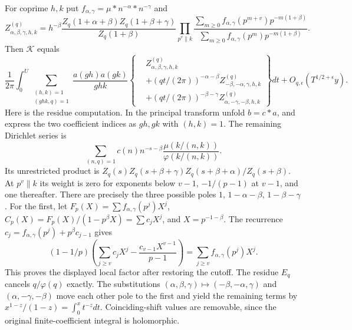 For coprime $h,k$ put $f_{\alpha,\gamma}=\mu*n^{-\alpha}*n^{-\gamma}$
and
\[
 Z^{(q)}_{\alpha,\beta,\gamma,h,k}
 =h^{-\beta}\frac{Z_q(1+\alpha+\beta)Z_q(1+\beta+\gamma)}{Z_q(1+\beta)}
 \prod_{p^v\parallel k}
 \frac{\sum_{m\ge0}f_{\alpha,\gamma}(p^{m+v})p^{-m(1+\beta)}}
      {\sum_{m\ge0}f_{\alpha,\gamma}(p^m)p^{-m(1+\beta)}}.
\]
Then $\mathcal K$ equals
\begin{equation}\label{eq:dirichlet-three-residue}
 \frac1{2\pi}\int_0^U\sum_{\substack{(h,k)=1\\(ghk,q)=1}}
 \frac{a(gh)a(gk)}{ghk}
 \left\{\begin{aligned}
 &Z^{(q)}_{\alpha,\beta,\gamma,h,k}\\
 &+(qt/(2\pi))^{-\alpha-\beta}Z^{(q)}_{-\beta,-\alpha,\gamma,h,k}\\
 &+(qt/(2\pi))^{-\beta-\gamma}Z^{(q)}_{\alpha,-\gamma,-\beta,h,k}
 \end{aligned}\right\}dt
 +O_{q,\epsilon}(T^{1/2+\epsilon}y).
\end{equation}
Here is the residue computation. In the principal transform unfold
$b=c*a$, and express the two coefficient indices as $gh,gk$ with
$(h,k)=1$. The remaining Dirichlet series is
\[
 \sum_{(n,q)=1}c(n)n^{-s-\beta}
                \frac{\mu(k/(n,k))}{\varphi(k/(n,k))}.
\]
Its unrestricted product is
$Z_q(s)Z_q(s+\beta+\gamma)Z_q(s+\beta+\alpha)/Z_q(s+\beta)$.
At $p^v\parallel k$ its weight is zero for exponents below $v-1$,
$-1/(p-1)$ at $v-1$, and one thereafter. There are precisely the
three possible poles $1$, $1-\alpha-\beta$, $1-\beta-\gamma$.
For the first, let $F_p(X)=\sum f_{\alpha,\gamma}(p^j)X^j$,
$C_p(X)=F_p(X)/(1-p^\beta X)=\sum c_jX^j$, and $X=p^{-1-\beta}$.
The recurrence $c_j=f_{\alpha,\gamma}(p^j)+p^\beta c_{j-1}$ gives
\[
 (1-1/p)\left(\sum_{j\ge v}c_jX^j-
                         \frac{c_{v-1}X^{v-1}}{p-1}\right)
             =\sum_{j\ge v}f_{\alpha,\gamma}(p^j)X^j.
\]
This proves the displayed local factor after restoring the cutoff.
The residue $E_q$ cancels $q/\varphi(q)$ exactly.
The substitutions $(\alpha,\beta,\gamma)\mapsto
(-\beta,-\alpha,\gamma)$ and $(\alpha,-\gamma,-\beta)$ move each
other pole to the first and yield the remaining terms by
$x^{1-z}/(1-z)=\int_0^x t^{-z}dt$. Coinciding-shift values are
removable, since the original finite-coefficient integral is holomorphic.

